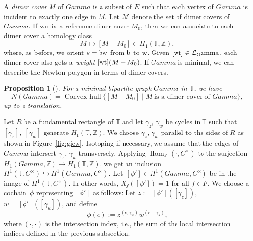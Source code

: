 \documentclass[10pt,a4paper]{amsart}
\numberwithin{equation}{section}
\newtheorem{Proposition}[Theorem]{Proposition}
 { \theoremstyle{definition}
\newtheorem{Definition}[Theorem]{Definition}
\newtheorem{Note}[Theorem]{Note}
\newtheorem{Example}[Theorem]{Example}
\newtheorem{Remark}[Theorem]{Remark} }
\newcommand{\Z}{{\mathbb Z}}
\newcommand{\C}{{\mathbb C}}
\newcommand{\T}{{\mathbb T}}
\newcommand{\ra}{\rightarrow}
\newcommand{\w}{{\rm w}}
\newcommand{\bw}{{\rm b}}
\DeclareMathOperator{\Hom}{Hom}
\def\Gamma{Gamma}
\def\C{C}
\begin{document}
	
	A \emph{dimer cover} $M$ of $\Gamma$ is a subset of $E$ such that each vertex of $\Gamma$ is incident to exactly one edge in $M$. Let $\mathcal M$ denote the set of dimer covers of $\Gamma$. If we fix a reference dimer cover $M_0$, then we can associate to each dimer cover a homology class
	\[
	M \mapsto [M-M_0] \in H_1(\T,\Z),
	\]
	where, as before, we orient $e=\bw \w$ from ${\rm b}$ to ${\rm w}$. Given $[\rm wt] \in \mathcal L_\Gamma$, each dimer cover also gets a~\emph{weight} $[{\rm wt}](M-M_0)$. If $\Gamma$ is minimal, we can describe the Newton polygon in terms of dimer covers.
	
	\begin{Proposition}
		[]
		For a minimal bipartite graph $\Gamma$ in $\T$, we have
		\[
		N(\Gamma)=\operatorname{Convex-hull}\{[M-M_0] \mid M \text{ is a dimer cover of }\Gamma\},
		\]
		up to a translation.
	\end{Proposition}
	Let $R$ be a fundamental rectangle of $\T$ and let $\gamma_z$, $\gamma_w$ be cycles in $\T$ such that~$[\gamma_z]$,~$[\gamma_w]$ generate $H_1(\T,\Z)$. We choose $\gamma_z$, $\gamma_w$ parallel to the sides of $R$ as shown in Figure~\ref{fig:giew}. Isotoping if necessary, we assume that the edges of $\Gamma$ intersect $\gamma_z$, $\gamma_w$ transversely. Applying $\Hom _\Z(\cdot,\C^\times)$ to the surjection $H_1(\Gamma,\Z) \ra H_1(\T,\Z)$, we get an inclusion $H^1(\T,\C^\times) \hookrightarrow H^1(\Gamma,\C^\times)$. Let~${[\phi'] \in H^1(\Gamma,\C^\times)}$ be in the image of $H^1(\T,\C^\times)$. In other words, $X_f([\phi'])=1$ for all $f \in F$. We choose a cochain~$\phi$ representing $[\phi']$ as follows: Let $z:=[\phi']([\gamma_z])$, $w=[\phi']([\gamma_w])$, and define
	\[
	\phi(e):=z^{(e,\gamma_w)} w^{(e,-\gamma_z)},
	\]
	where $(\cdot,\cdot)$ is the intersection index, i.e., the sum of the local intersection indices defined in the previous subsection.
	
\end{document}
